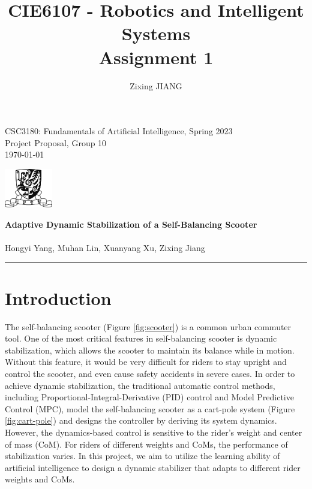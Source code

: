 \documentclass[10pt,a4paper]{article}
\title{\textbf{CIE6107 - Robotics and Intelligent Systems \\Assignment 1}}
\author{Zixing JIANG}
\begin{document}
	
\begin{flushleft}
	CSC3180: Fundamentals of Artificial Intelligence, Spring 2023\\
	Project Proposal, Group 10\\
	\today
\end{flushleft}
	
\begin{flushright}\vspace{-18mm}
	\includegraphics[height=1.7cm]{figure/logo.png}
\end{flushright}
	
\begin{center}\vspace{0.5cm}
	\textbf{\Large Adaptive Dynamic Stabilization of a Self-Balancing Scooter}\\~\\
	\large Hongyi Yang, Muhan Lin, Xuanyang Xu, Zixing Jiang
\end{center}
{\noindent}\rule{\linewidth}{0.1mm}

\section{Introduction}
The self-balancing scooter (Figure \ref{fig:scooter}) is a common urban commuter tool. One of the most critical features in self-balancing scooter is dynamic stabilization,  which allows the scooter to maintain its balance while in motion. Without this feature, it would be very difficult for riders to stay upright and control the scooter, and even cause safety accidents in severe cases. In order to achieve dynamic stabilization, the traditional automatic control methods, including Proportional-Integral-Derivative (PID) control and Model Predictive Control (MPC), model the self-balancing scooter as a cart-pole system (Figure \ref{fig:cart-pole}) and designs the controller by deriving its system dynamics. However, the dynamics-based control is sensitive to the rider's weight and center of mass (CoM). For riders of different weights and CoMs, the performance of stabilization varies. In this project, we aim to utilize the learning ability of artificial intelligence to design a dynamic stabilizer that adapts to different rider weights and CoMs.
\end{document}
